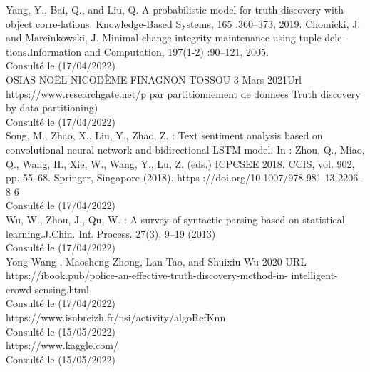 \documentclass[12pt]{report}
\begin{document}
\begin{thebibliography}{99}
 Yang, Y., Bai, Q., and Liu, Q. A probabilistic model for truth discovery with object corre-lations. Knowledge-Based Systems, 165 :360–373, 2019.
Chomicki, J. and Marcinkowski, J. Minimal-change integrity maintenance using tuple dele-
tions.Information and Computation, 197(1-2) :90–121, 2005.
			\\Consulté le (17/04/2022)\\


 OSIAS NOËL NICODÈME FINAGNON TOSSOU 3 Mars 2021Url https://www.researchgate.net/p
par partitionnement de donnees Truth discovery by data partitioning)
			\\Consulté le (17/04/2022)\\

 Song, M., Zhao, X., Liu, Y., Zhao, Z. : Text sentiment analysis based on convolutional neural network and bidirectional LSTM model. In : Zhou, Q., Miao, Q., Wang, H., Xie,
W., Wang, Y., Lu, Z. (eds.) ICPCSEE 2018. CCIS, vol. 902, pp. 55–68. Springer, Singapore
(2018). https ://doi.org/10.1007/978-981-13-2206-8 6 
			\\Consulté le (17/04/2022)\\

 Wu, W., Zhou, J., Qu, W. : A survey of syntactic parsing based on statistical learning.J.Chin. Inf. Process. 27(3), 9–19 (2013)
			\\Consulté le (17/04/2022)\\ 

 Yong Wang , Maosheng Zhong, Lan Tao, and Shuixiu Wu 2020 URL https://ibook.pub/police-an-effective-truth-discovery-method-in- intelligent-crowd-sensing.html
		\\	Consulté le (17/04/2022)\\

 https://www.isnbreizh.fr/nsi/activity/algoRefKnn
			\\Consulté le (15/05/2022)\\

 https://www.kaggle.com/
			\\Consulté le (15/05/2022)\\
			

\end{thebibliography}
\end{document}
